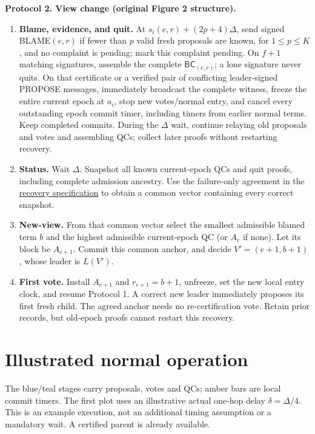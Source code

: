 \documentclass[10pt,a4paper]{article}
\newcommand{\BC}{\mathsf{BC}}
\newcommand{\chg}[1]{\textcolor{red!70!black}{#1}}
\begin{document}
\begin{mdframed}[linewidth=.6pt,innertopmargin=5pt,innerbottommargin=5pt]
\textbf{Protocol 2. View change (original Figure 2 structure).}
\begin{enumerate}[label=\textbf{\roman*.},itemsep=3pt]
\item \textbf{Blame, evidence, and quit.} At
$s_i(e,r)+(2p+4)\Delta$, send signed BLAME$(e,r)$ if fewer than $p$
valid fresh proposals are known, for $1\le p\le K$, and no complaint
is pending; mark this complaint pending. On $f+1$ matching
signatures, assemble the complete $\BC_{(e,r)}$; a lone signature never
quits. \chg{On that certificate or a verified pair of conflicting
leader-signed PROPOSE messages, immediately broadcast the complete witness,
freeze the entire current epoch at $a_i$, stop new votes/normal entry, and
cancel every outstanding epoch commit timer, including timers from earlier
normal terms.} Keep completed commits. During the $\Delta$ wait, continue
relaying old proposals and votes and assembling QCs; collect later proofs
without restarting recovery.
\item \textbf{Status.} Wait $\Delta$. \chg{Snapshot all known current-epoch
QCs and quit proofs, including complete admission ancestry. Use the
failure-only agreement in the \hyperref[sec:agreement]{recovery specification} to obtain a common
vector containing every correct snapshot.}
\item \textbf{New-view.} \chg{From that common vector select the smallest
admissible blamed term $b$ and the highest admissible current-epoch QC
(or $A_e$ if none). Let its block be $A_{e+1}$. Commit this common anchor,
and decide $V'=(e+1,b+1)$, whose leader is $L(V')$.}
\item \textbf{First vote.} \chg{Install $A_{e+1}$ and $r_{e+1}=b+1$, unfreeze,
set the new local entry clock, and resume Protocol 1. A correct new leader
immediately proposes its first fresh child. The agreed anchor needs no re-certification vote.
Retain prior records, but old-epoch proofs cannot restart this recovery.}
\end{enumerate}
\end{mdframed}


\clearpage
\section*{Illustrated normal operation}
The blue/teal stages carry proposals, votes and QCs; amber bars are local
commit timers. The first plot uses an illustrative actual one-hop delay
$\delta=\Delta/4$. This is an example execution, not an additional timing
assumption or a mandatory wait. A certified parent is already available.
\end{document}
